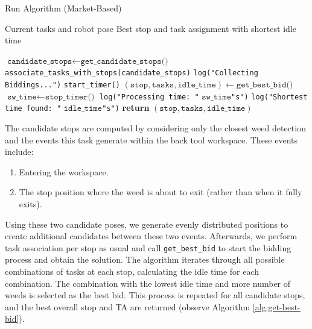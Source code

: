\begin{algorithm}
    \caption{Run Algorithm (Market-Based)}
    \label{alg:run-algorithm}
    \begin{algorithmic}[1]
        \REQUIRE Current tasks and robot pose
        \ENSURE Best stop and task assignment with shortest idle time

        \STATE $\texttt{candidate\_stops} \gets \texttt{get\_candidate\_stops()}$
        \STATE \texttt{associate\_tasks\_with\_stops(candidate\_stops)}
        \STATE \texttt{log("Collecting Biddings...")}
        \ENDIF
        \STATE \texttt{start\_timer()}
        \STATE $(\texttt{stop}, \texttt{tasks}, \texttt{idle\_time}) \gets \texttt{get\_best\_bid()}$
        \STATE $\texttt{sw\_time} \gets \texttt{stop\_timer()}$
        \STATE \texttt{log("Processing time: "} $\texttt{sw\_time}$\texttt{"s")}
        \STATE \texttt{log("Shortest time found: "} $\texttt{idle\_time}$\texttt{"s")}
        \ENDIF
        \STATE \textbf{return} $(\texttt{stop}, \texttt{tasks}, \texttt{idle\_time})$
    \end{algorithmic}
\end{algorithm}

The candidate stops are computed by considering only the closest weed detection and the events this task generate within the back tool workspace. These events include:

\begin{enumerate}
    \item Entering the workspace.
    \item The stop position where the weed is about to exit (rather than when it fully exits).
\end{enumerate}

Using these two candidate poses, we generate evenly distributed positions to create additional candidates between these two events. Afterwards, we perform task association per stop as usual and call \texttt{get\_best\_bid} to start the bidding process and obtain the solution. The algorithm iterates through all possible combinations of tasks at each stop, calculating the idle time for each combination. The combination with the lowest idle time and more number of weeds is selected as the best bid. This process is repeated for all candidate stops, and the best overall stop and \ac{TA} are returned (observe Algorithm \ref{alg:get-best-bid}).


